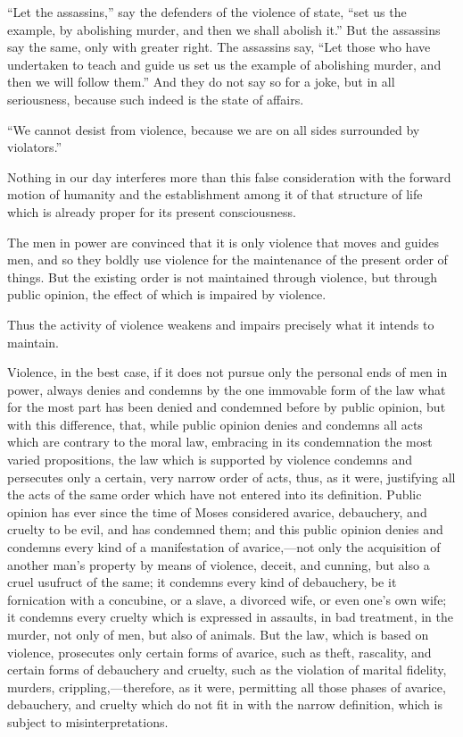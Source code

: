 \documentclass{book}
\begin{document}
“Let the assassins,” say the defenders of the violence of state, “set us the example, by abolishing murder, and then we shall abolish it.” But the assassins say the same, only with greater right. The assassins say, “Let those who have undertaken to teach and guide us set us the example of abolishing murder, and then we will follow them.” And they do not say so for a joke, but in all seriousness, because such indeed is the state of affairs.

“We cannot desist from violence, because we are on all sides surrounded by violators.”

Nothing in our day interferes more than this false consideration with the forward motion of humanity and the establishment among it of that structure of life which is already proper for its present consciousness.

The men in power are convinced that it is only violence that moves and guides men, and so they boldly use violence for the maintenance of the present order of things. But the existing order is not maintained through violence, but through public opinion, the effect of which is impaired by violence.

Thus the activity of violence weakens and impairs precisely what it intends to maintain.

Violence, in the best case, if it does not pursue only the personal ends of men in power, always denies and condemns by the one immovable form of the law what for the most part has been denied and condemned before by public opinion, but with this difference, that, while public opinion denies and condemns all acts which are contrary to the moral law, embracing in its condemnation the most varied propositions, the law which is supported by violence condemns and persecutes only a certain, very narrow order of acts, thus, as it were, justifying all the acts of the same order which have not entered into its definition. Public opinion has ever since the time of Moses considered avarice, debauchery, and cruelty to be evil, and has condemned them; and this public opinion denies and condemns every kind of a manifestation of avarice,—not only the acquisition of another man’s property by means of violence, deceit, and cunning, but also a cruel usufruct of the same; it condemns every kind of debauchery, be it fornication with a concubine, or a slave, a divorced wife, or even one’s own wife; it condemns every cruelty which is expressed in assaults, in bad treatment, in the murder, not only of men, but also of animals. But the law, which is based on violence, prosecutes only certain forms of avarice, such as theft, rascality, and certain forms of debauchery and cruelty, such as the violation of marital fidelity, murders, crippling,—therefore, as it were, permitting all those phases of avarice, debauchery, and cruelty which do not fit in with the narrow definition, which is subject to misinterpretations.
\end{document}
